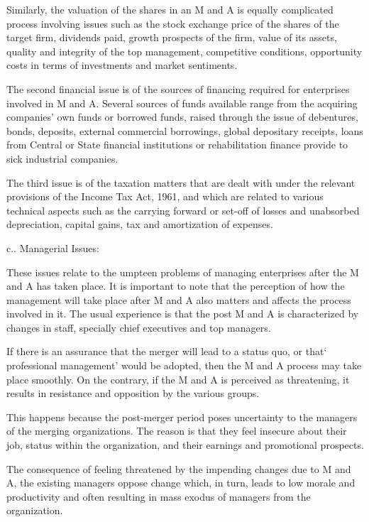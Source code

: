 \documentclass{article}
\begin{document}
Similarly, the valuation of the shares in an M and A is equally complicated process involving issues such as the stock exchange
 price of the shares of the target firm, dividends paid, growth prospects of the firm, value of its assets, quality and integrity
  of the top management, competitive conditions, opportunity costs in terms of investments and market sentiments.

The second financial issue is of the sources of financing required for enterprises involved in M and A. Several sources of 
funds available range from the acquiring companies’ own funds or borrowed funds, raised through the issue of debentures, bonds,
 deposits, external commercial borrowings, global depositary receipts, loans from Central or State financial institutions or 
 rehabilitation finance provide to sick industrial companies.

The third issue is of the taxation matters that are dealt with under the relevant provisions of the Income Tax Act, 1961, and
 which are related to various technical aspects such as the carrying forward or set-off of losses and unabsorbed depreciation, 
 capital gains, tax and amortization of expenses.

c.. Managerial Issues:

These issues relate to the umpteen problems of managing enterprises after the M and A has taken place. It is important to note
 that the perception of how the management will take place after M and A also matters and affects the process involved in it. 
 The usual experience is that the post M and A is characterized by changes in staff, specially chief executives and top managers.

If there is an assurance that the merger will lead to a status quo, or that‘ professional management’ would be adopted,
 then the M and A process may take place smoothly. On the contrary, if the M and A is perceived as threatening, it results 
 in resistance and opposition by the various groups.

This happens because the post-merger period poses uncertainty to the managers of the merging organizations. The reason is that
 they feel insecure about their job, status within the organization, and their earnings and promotional prospects.

The consequence of feeling threatened by the impending changes due to M and A, the existing managers oppose change which, in
 turn, leads to low morale and productivity and often resulting in mass exodus of managers from the organization.
\end{document}
